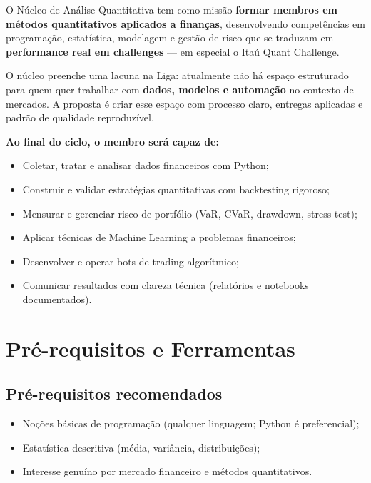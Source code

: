 \documentclass[12pt,a4paper]{article}
\begin{document}
O Núcleo de Análise Quantitativa tem como missão \textbf{formar membros em métodos quantitativos aplicados a finanças}, desenvolvendo competências em programação, estatística, modelagem e gestão de risco que se traduzam em \textbf{performance real em challenges} — em especial o Itaú Quant Challenge.

O núcleo preenche uma lacuna na Liga: atualmente não há espaço estruturado para quem quer trabalhar com \textbf{dados, modelos e automação} no contexto de mercados. A proposta é criar esse espaço com processo claro, entregas aplicadas e padrão de qualidade reproduzível.

\vspace{0.3cm}
\noindent\textbf{Ao final do ciclo, o membro será capaz de:}
\begin{itemize}[leftmargin=*]
    \item Coletar, tratar e analisar dados financeiros com Python;
    \item Construir e validar estratégias quantitativas com backtesting rigoroso;
    \item Mensurar e gerenciar risco de portfólio (VaR, CVaR, drawdown, stress test);
    \item Aplicar técnicas de Machine Learning a problemas financeiros;
    \item Desenvolver e operar bots de trading algorítmico;
    \item Comunicar resultados com clareza técnica (relatórios e notebooks documentados).
\end{itemize}

\section{Pré-requisitos e Ferramentas}

\subsection{Pré-requisitos recomendados}
\begin{itemize}[leftmargin=*]
    \item Noções básicas de programação (qualquer linguagem; Python é preferencial);
    \item Estatística descritiva (média, variância, distribuições);
    \item Interesse genuíno por mercado financeiro e métodos quantitativos.
\end{itemize}
\end{document}
